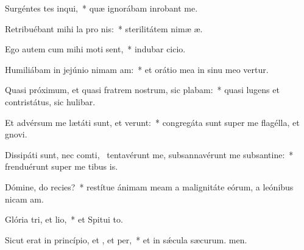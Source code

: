 \item Surgéntes tes inqui,~* quæ ignorábam inrobant me.
\item Retribuébant mihi la pro nis:~* sterilitátem nimæ æ.
\item Ego autem cum mihi moti sent,~* indubar cicio.
\item Humiliábam in jejúnio nimam am:~* et orátio mea in sinu meo vertur.
\item Quasi próximum, et quasi fratrem nostrum, sic plabam:~* quasi lugens et contristátus, sic hulibar.
\item Et advérsum me lætáti sunt, et verunt:~* congregáta sunt super me flagélla, et gnovi.
\item Dissipáti sunt, nec comti,~\pscross{} tentavérunt me, subsannavérunt me subsantine:~* frenduérunt super me tibus is.
\item Dómine, do recies?~* restítue ánimam meam a malignitáte eórum, a leónibus nicam am.
\item Glória tri, et lio,~* et Spitui to.
\item Sicut erat in princípio, et , et per,~* et in sǽcula sæcurum. men.
